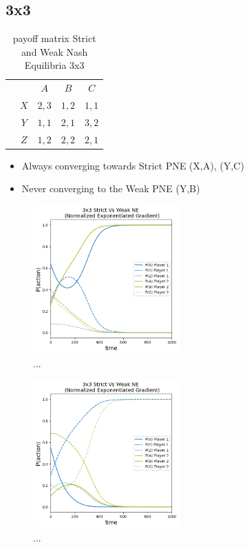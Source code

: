 \subsection{3x3}\label{subsection:3x3}

\begin{table}\centering
\setlength{\extrarowheight}{2pt}
\begin{tabular}{cc|c|c|c|}
  & \multicolumn{1}{c}{} & \multicolumn{1}{c}{$A$}  & \multicolumn{1}{c}{$B$}  & \multicolumn{1}{c}{$C$} \\\cline{3-5}
            & $X$ & $2,3$ & $1,2$ & $1,1$ \\ \cline{3-5}
            & $Y$ & $1,1$ & $2,1$ & $3,2$ \\\cline{3-5}
            & $Z$ & $1,2$ & $2,2$ & $2,1$ \\\cline{3-5}
\end{tabular}\caption{\label{tab:payoffStrictAndWeak3x3}payoff matrix Strict and Weak Nash Equilibria 3x3}
\end{table}

\begin{itemize}
    \item Always converging towards Strict PNE (X,A), (Y,C)
    \item Never converging to the Weak PNE (Y,B)
\end{itemize}

\begin{figure}
    \centering
    \includegraphics[width=0.5\textwidth]{logos/Weak3x3-1.png}
    \caption{...}
    \label{fig:Weak3x3-1}
\end{figure}

\begin{figure}
    \centering
    \includegraphics[width=0.5\textwidth]{logos/Weak3x3-2.png}
    \caption{...}
    \label{fig:Weak3x3-2}
\end{figure}
